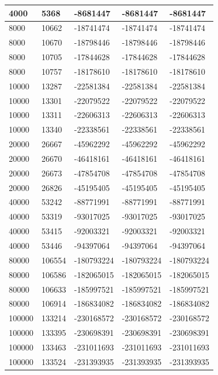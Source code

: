 \begin{longtable}[H]{|p{1.5cm}|p{1.5cm}|p{2cm}|p{3cm}|p{4cm}|}
    4000 & 5368 & -8681447 & -8681447 & -8681447 \\ \hline 
    8000 & 10662 & -18741474 & -18741474 & -18741474 \\ \hline  
    8000 & 10670 & -18798446 & -18798446 & -18798446 \\ \hline  
    8000 & 10705 & -17844628 & -17844628 & -17844628 \\ \hline
    8000 & 10757 & -18178610 & -18178610 & -18178610 \\ \hline  
    10000 & 13287 & -22581384 & -22581384 & -22581384 \\ \hline
    10000 & 13301 & -22079522 & -22079522 & -22079522 \\ \hline
    10000 & 13311 & -22606313 & -22606313 & -22606313 \\ \hline
    10000 & 13340 & -22338561 & -22338561 & -22338561 \\ \hline 
    20000 & 26667 & -45962292 & -45962292 & -45962292 \\ \hline
    20000 & 26670 & -46418161 & -46418161 & -46418161 \\ \hline
    20000 & 26673 & -47854708 & -47854708 & -47854708 \\ \hline
    20000 & 26826 & -45195405 & -45195405 & -45195405 \\ \hline
    40000 & 53242 & -88771991 & -88771991 & -88771991 \\ \hline
    40000 & 53319 & -93017025 & -93017025 & -93017025 \\ \hline
    40000 & 53415 & -92003321 & -92003321 & -92003321 \\ \hline
    40000 & 53446 & -94397064 & -94397064 & -94397064 \\ \hline
    80000 & 106554 & -180793224 & -180793224 & -180793224 \\ \hline 
    80000 & 106586 & -182065015 & -182065015 & -182065015 \\ \hline 
    80000 & 106633 & -185997521 & -185997521 & -185997521 \\ \hline
    80000 & 106914 & -186834082 & -186834082 & -186834082 \\ \hline
    100000 & 133214 & -230168572 & -230168572 & -230168572 \\ \hline
    100000 & 133395 & -230698391 & -230698391 & -230698391 \\ \hline
    100000 & 133463 & -231011693 & -231011693 & -231011693 \\ \hline
    100000 & 133524 & -231393935 & -231393935 & -231393935  \\ \hline
\end{longtable}
\newpage
